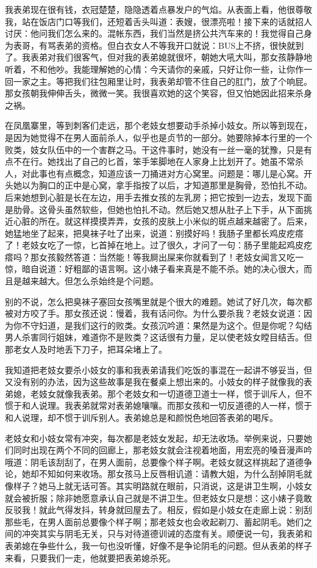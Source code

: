 我表弟现在很有钱，衣冠楚楚，隐隐透着点暴发户的气焰。从表面上看，他很尊敬我，站在饭店门口等我们，还短着舌头叫道：表嫂，很漂亮啦！接下来的话就招人讨厌：他问我们怎么来的。混帐东西，我们当然是挤公共汽车来的！我觉得自己身为表哥，有骂表弟的资格。但白衣女人不等我开口就说：BUS上不挤，很快就到了。我表弟对我们很客气，但对我的表弟媳就很坏，朝她大吼大叫，那女孩静静地听着，不和他吵。我能理解她的心情：今天请你的亲戚，只好让你一些，让你作一回一家之主。等把我们往包厢里让时，我表弟却管不住自己的肛门，放了个响屁。那女孩朝我伸伸舌头，微微一笑。我很喜欢她的这个笑容，但又怕她因此招来杀身之祸。 

在凤凰寨里，等到刺客们走远，那个老妓女想要动手杀掉小妓女。所以等到现在，是因为她觉得不在男人面前杀人，似乎也是贞节的一部分。她要除掉本行里的一个败类，妓女队伍中的一个害群之马。干这件事时，她没有一丝一毫的犹豫，只是有点不在行。她找出了自己的匕首，笨手笨脚地在人家身上比划开了。她虽不常杀人，对此事也有点概念，知道应该一刀捅进对方心窝里。问题是：哪儿是心窝。开头她以为胸口的正中是心窝，拿手指按了以后，才知道那里是胸骨，恐怕扎不动。后来她想到心脏是长在左边，用手去推女孩的左乳房；把它按到一边去，发现下面是肋骨。这骨头虽然软些，但她也怕扎不动。然后她又想从肚子上下手，从下面挑近心脏的所在。就这样摸摸弄弄，女孩的皮肤上小米似的斑点越来越密了。后来，她猛地坐了起来，把臭袜子吐了出来，说道：别摸好吗！我肠子里都长鸡皮疙瘩了！老妓女吃了一惊，匕首掉在地上。过了很久，才问了一句：肠子里能起鸡皮疙瘩吗？那女孩毅然答道：当然能！等我屙出屎来你就看到了！老妓女闻言又吃一惊，暗自说道：好粗鄙的语言啊。这小婊子看来真是不能不杀。她的决心很大，而且是越来越大。但怎么杀始终是个问题。 

别的不说，怎么把臭袜子塞回女孩嘴里就是个很大的难题。她试了好几次，每次都被对方咬了手。那女孩还说：慢着，我有话问你。为什么要杀我？老妓女说道：因为你不守妇道，是我们这行的败类。女孩沉吟道：果然是为这个。但是你呢？勾结男人杀害同行姐妹，难道你不是败类？这话很有力量，足以使老妓女瞠目结舌。但那老女人及时地丢下刀子，把耳朵堵上了。 

我知道把老妓女要杀小妓女的事和我表弟请我们吃饭的事混在一起讲不够妥当，但又没有别的办法，因为这些故事是我在餐桌上想出来的。小妓女的样子就像我的表弟媳，老妓女就像我表弟。那个老妓女和一切道德卫道士一样，惯于训斥人，但不惯于和人说理。我表弟就常对表弟媳嚷嚷。而那女孩和一切反道德的人一样，惯于和人说理，却不惯于训斥别人。表弟媳总是和颜悦色地回答表弟的喝斥。 

老妓女和小妓女常有冲突，每次都是老妓女发起，却无法收场。举例来说，只要她们同时出现在两个不同的回廊上，那老妓女就会注视着地面，用宏亮的嗓音漫声吟哦道：阴毛该刮刮了，在男人面前，总要像个样子啊。老妓女就这样挑起了道德争论，她却不知如何来收场。那女孩马上反唇相讥道：请教大姐，为什么刮掉阴毛就像样子？她马上就无话可答。其实明路就在眼前，只消说，这是讲卫生啊，小妓女就会被折服；除非她愿意承认自己就是不讲卫生。但老妓女只是想：这小婊子竟敢反驳我！就此气得发抖，转身就回屋去了。相反，假如是小妓女在走廊上说：别刮那些毛，在男人面前总要像个样子啊；那老妓女也会收起剃刀、蓄起阴毛。她们之间的冲突其实与阴毛无关，只与对待道德训诫的态度有关。顺便说一句，我表弟和表弟媳在争些什么，我一句也没听懂，好像不是争论阴毛的问题。但从表弟的样子来看，只要我们一走，他就要把表弟媳杀死。 

